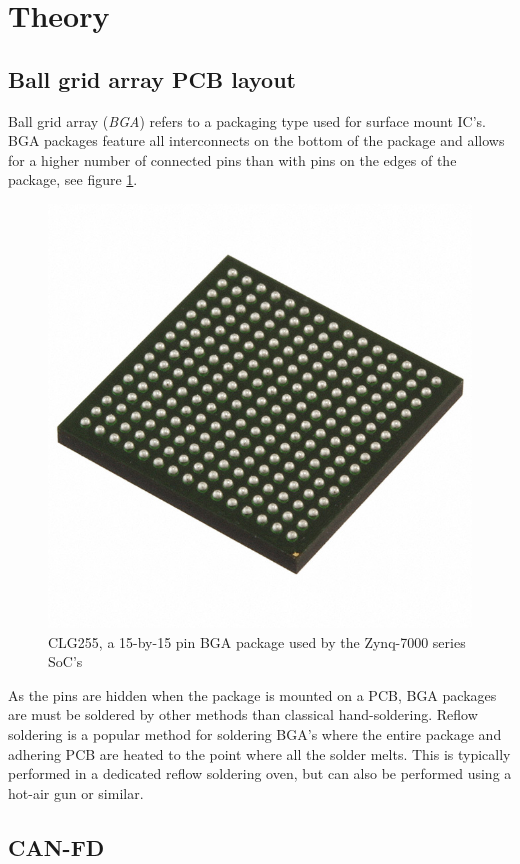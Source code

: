 \section{Theory}

\subsection{Ball grid array PCB layout}

Ball grid array (\emph{BGA}) refers to a packaging type used for surface mount IC's. BGA packages feature all interconnects on the bottom of the package and allows for a higher number of connected pins than with pins on the edges of the package, see figure \ref{fig:clg255}.

\begin{figure}[H]
    \centering
    \includegraphics[width=.75\textwidth]{media/CLG225.JPG}
    \caption{CLG255, a 15-by-15 pin BGA package used by the Zynq-7000 series SoC's \cite{clg225}}
    \label{fig:clg255}
\end{figure}

As the pins are hidden when the package is mounted on a PCB, BGA packages are must be soldered by other methods than classical hand-soldering. Reflow soldering is a popular method for soldering BGA's where the entire package and adhering PCB are heated to the point where all the solder melts. This is typically performed in a dedicated reflow soldering oven, but can also be performed using a hot-air gun or similar.


\subsection{CAN-FD}

